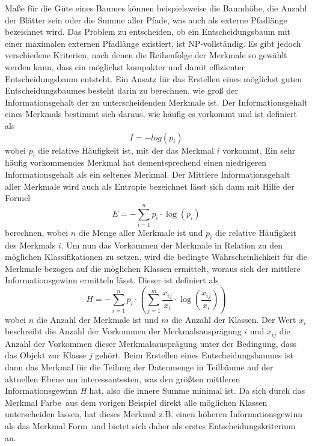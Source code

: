 Maße für die Güte eines Baumes können beispielsweise die Baumhöhe, die Anzahl der Blätter sein oder die Summe aller Pfade, was auch als externe Pfadlänge bezeichnet wird. Das Problem zu entscheiden, ob ein Entscheidungsbaum mit einer maximalen externen Pfadlänge existiert, ist NP-vollständig. Es gibt jedoch verschiedene Kriterien, nach denen die Reihenfolge der Merkmale so gewählt werden kann, dass ein möglichst kompakter und damit effizienter Entscheidungsbaum entsteht. Ein Ansatz für das Erstellen eines möglichst guten Entscheidungsbaumes besteht darin zu berechnen, wie groß der Informationsgehalt der zu unterscheidenden Merkmale ist. Der Informationsgehalt eines Merkmals bestimmt sich daraus, wie häufig es vorkommt und ist definiert als 
\[I = -log(p_i)\] wobei $p_i$ die relative Häufigkeit ist, mit der das Merkmal $i$ vorkommt. Ein sehr häufig vorkommendes Merkmal hat dementsprechend einen niedrigeren Informationsgehalt als ein seltenes Merkmal. Der Mittlere Informationsgehalt aller Merkmale wird auch als Entropie bezeichnet lässt sich dann mit Hilfe der Formel 
\[E = - \sum \limits_{i=1}^n p_i \cdot \log (p_i)\] berechnen, wobei $n$ die Menge aller Merkmale ist und $p_i$ die relative Häufigkeit des Merkmals $i$.
Um nun das Vorkommen der Merkmale in Relation zu den möglichen Klassifikationen zu setzen, wird die bedingte Wahrscheinlichkeit für die Merkmale bezogen auf die möglichen Klassen ermittelt, woraus sich der mittlere Informationsgewinn ermitteln lässt. Dieser ist definiert als 
\[H = - \sum \limits_{i=1}^n p_i \cdot \left( \sum \limits_{j=1}^m \frac{x_{ij}}{x_i} \cdot \log (\frac{x_{ij}}{x_i})\right) \] wobei $n$ die Anzahl der Merkmale ist und $m$ die Anzahl der Klassen. Der Wert $x_i$ beschreibt die Anzahl der Vorkommen der Merkmalsausprägung $i$ und $x_{ij}$ die Anzahl der Vorkommen dieser Merkmalsausprägung unter der Bedingung, dass das Objekt zur Klasse $j$ gehört.
Beim Erstellen eines Entscheidungsbaumes ist dann das Merkmal für die Teilung der Datenmenge in Teilbäume auf der aktuellen Ebene am interessantesten, was den größten mittleren Informationsgewinn \textit{H} hat, also die innere Summe minimal ist.
Da sich durch das Merkmal \glqq Farbe\grqq\ aus dem vorigen Beispiel direkt alle möglichen Klassen unterscheiden lassen, hat dieses Merkmal z.B. einen höheren Informationsgewinn als das Merkmal \glqq Form\grqq\ und bietet sich daher als erstes Entscheidungskriterium an.

